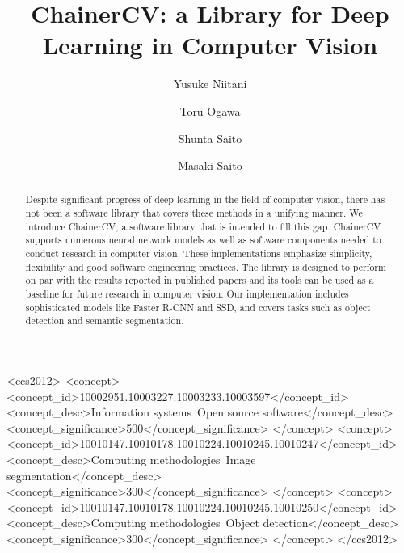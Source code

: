 \documentclass[sigconf]{acmart}
\begin{document}
\setlength{}

\title{ChainerCV: a Library for Deep Learning in Computer Vision}




\author{Yusuke Niitani}

\author{Toru Ogawa}

\author{Shunta Saito}

\author{Masaki Saito}



\renewcommand{\shortauthors}{Y. Niitani, T. Ogawa, S. Saito, \& M. Saito}

\begin{abstract}
Despite significant progress of deep learning in the field of computer vision, there has not been a software library that covers these methods in a unifying manner.
We introduce ChainerCV, a software library that is intended to fill this gap.
ChainerCV supports numerous neural network models as well as software components needed to conduct research in computer vision.
These implementations emphasize simplicity, flexibility and good software engineering practices.
The library is designed to perform on par with the results reported in published papers and its tools can be used as a baseline for future research in computer vision.
Our implementation includes sophisticated models like Faster R-CNN and SSD, and covers tasks such as object detection and semantic segmentation.
\end{abstract}

\begin{CCSXML}
<ccs2012>
<concept>
<concept_id>10002951.10003227.10003233.10003597</concept_id>
<concept_desc>Information systems~Open source software</concept_desc>
<concept_significance>500</concept_significance>
</concept>
<concept>
<concept_id>10010147.10010178.10010224.10010245.10010247</concept_id>
<concept_desc>Computing methodologies~Image segmentation</concept_desc>
<concept_significance>300</concept_significance>
</concept>
<concept>
<concept_id>10010147.10010178.10010224.10010245.10010250</concept_id>
<concept_desc>Computing methodologies~Object detection</concept_desc>
<concept_significance>300</concept_significance>
</concept>
</ccs2012>
\end{CCSXML}
\end{document}
